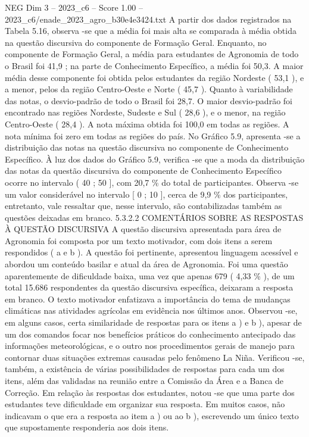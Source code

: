 \begin{textsample}{NEG Dim 3 – 2023\_c6 – Score 1.00 – 2023\_c6/enade\_2023\_agro\_b30e4e3424.txt}
A partir dos dados registrados na Tabela 5.16, observa -se que a média foi mais alta se comparada à média obtida na questão discursiva do componente de Formação Geral.
Enquanto, no componente de Formação Geral, a média para estudantes de Agronomia de todo o Brasil foi 41,9 ; na parte de Conhecimento Específico, a média foi 50,3.
A maior média desse componente foi obtida pelos estudantes da região Nordeste ( 53,1 ), e a menor, pelos da região Centro-Oeste e Norte ( 45,7 ).
Quanto à variabilidade das notas, o desvio-padrão de todo o Brasil foi 28,7.
O maior desvio-padrão foi encontrado nas regiões Nordeste, Sudeste e Sul ( 28,6 ), e o menor, na região Centro-Oeste ( 28,4 ).
A nota máxima obtida foi 100,0 em todas as regiões.
A nota mínima foi zero em todas as regiões do país.
No Gráfico 5.9, apresenta -se a distribuição das notas na questão discursiva no componente de Conhecimento Específico.
À luz dos dados do Gráfico 5.9, verifica -se que a moda da distribuição das notas da questão discursiva do componente de Conhecimento Específico ocorre no intervalo ( 40 ; 50 ], com 20,7 \% do total de participantes.
Observa -se um valor considerável no intervalo [ 0 ; 10 ], cerca de 9,9 \% dos participantes, entretanto, vale ressaltar que, nesse intervalo, são contabilizadas também as questões deixadas em branco. 5.3.2.2 COMENTÁRIOS SOBRE AS RESPOSTAS À QUESTÃO DISCURSIVA A questão discursiva apresentada para área de Agronomia foi composta por um texto motivador, com dois itens a serem respondidos ( a e b ).
A questão foi pertinente, apresentou linguagem acessível e abordou um conteúdo basilar e atual da área de Agronomia.
Foi uma questão aparentemente de dificuldade baixa, uma vez que apenas 679 ( 4,33 \% ), de um total 15.686 respondentes da questão discursiva específica, deixaram a resposta em branco.
O texto motivador enfatizava a importância do tema de mudanças climáticas nas atividades agrícolas em evidência nos últimos anos.
Observou -se, em alguns casos, certa similaridade de respostas para os itens a ) e b ), apesar de um dos comandos focar nos benefícios práticos do conhecimento antecipado das informações meteorológicas, e o outro nos procedimentos gerais de manejo para contornar duas situações extremas causadas pelo fenômeno La Niña.
Verificou -se, também, a existência de várias possibilidades de respostas para cada um dos itens, além das validadas na reunião entre a Comissão da Área e a Banca de Correção.
Em relação às respostas dos estudantes, notou -se que uma parte dos estudantes teve dificuldade em organizar sua resposta.
Em muitos casos, não indicavam o que era a resposta ao item a ) ou ao b ), escrevendo um único texto que supostamente responderia aos dois itens.

\end{textsample}
